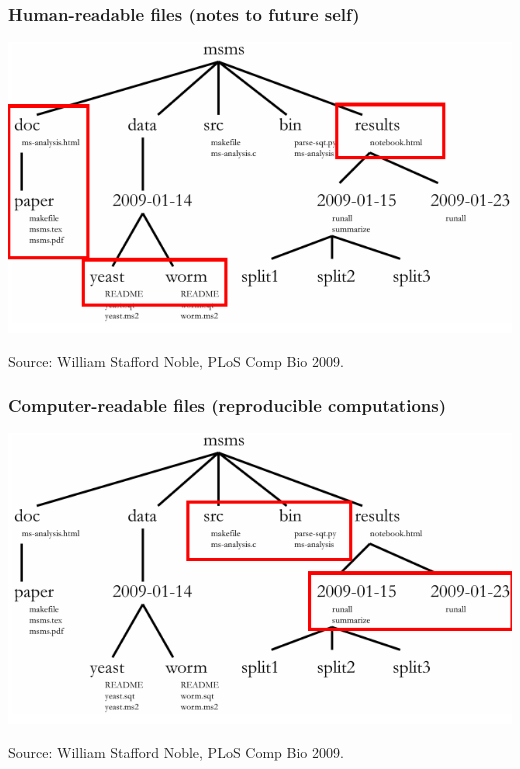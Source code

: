 \documentclass{beamer}
\begin{document}
\begin{frame}
  \frametitle{Human-readable files (notes to future self)}
  \includegraphics[width=\textwidth]{figure-noble-directories-docs}

  Source: William Stafford Noble, PLoS Comp Bio 2009.
\end{frame}

\begin{frame}
  \frametitle{Computer-readable files (reproducible computations)}
  \includegraphics[width=\textwidth]{figure-noble-directories-scripts}

  Source: William Stafford Noble, PLoS Comp Bio 2009.
\end{frame}
\end{document}
